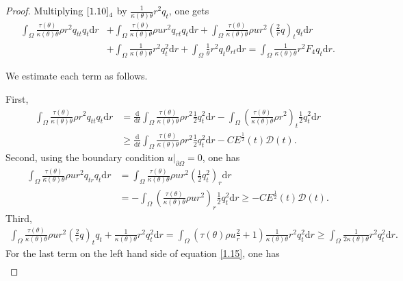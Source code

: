 \documentclass[11pt,reqno]{amsart}
\numberwithin{equation}{section}
\newcommand{\dif}{\mathrm{d}}
\begin{document}
\begin{proof}
 Multiplying $\eqref{1.10}_4$ by $\frac{1}{\kappa(\theta) \theta} r^2 q_t$, one gets
 \begin{align}
 \int_{\Omega}  \frac{\tau(\theta) }{\kappa(\theta) \theta} \rho r^2 q_{tt}  q_t\dif r&+\int_{\Omega} \frac{\tau(\theta) }{\kappa(\theta) \theta} \rho u r^2 q_{rt} q_t \dif r +\int_{\Omega} \frac{\tau(\theta) }{\kappa(\theta) \theta} \rho u r^2 \left(\frac{2}{r}q \right)_t q_t\dif r \nonumber\\
 &+\int_{\Omega} \frac{1}{\kappa(\theta)\theta} r^2 q_t^2 \dif r+\int_{\Omega} \frac{1}{\theta} r^2 q_t \theta_{rt} \dif r
 =\int_{\Omega} \frac{1}{\kappa(\theta)\theta} r^2 F_4 q_t \dif r. \label{1.15}
 \end{align}

 We estimate each term as follows.

 First,
 \begin{align*}
 \int_{\Omega} \frac{\tau(\theta) }{\kappa(\theta) \theta} \rho r^2 q_{tt} q_t\dif r&=\frac{\dif}{\dif t} \int_{\Omega} \frac{\tau(\theta) }{\kappa(\theta) \theta}\rho r^2 \frac{1}{2} q_t^2\dif r -\int_{\Omega} \left(\frac{\tau(\theta) }{\kappa(\theta) \theta} \rho r^2 \right)_t \frac{1}{2} q_t^2 \dif r\\
 & \ge \frac{\dif}{\dif t} \int_{\Omega} \frac{\tau(\theta) }{\kappa(\theta) \theta}\rho r^2 \frac{1}{2} q_t^2\dif r-CE^\frac{1}{2}(t) \mathcal D(t).
 \end{align*}
 Second, using the boundary condition $u|_{\partial \Omega}=0$, one has
 \begin{align*}
 \int_{\Omega} \frac{\tau(\theta) }{\kappa(\theta) \theta}  \rho u r^2 q_{tr} q_t \dif r &= \int_{\Omega} \frac{\tau(\theta) }{\kappa(\theta) \theta}  \rho u r^2 \left(\frac{1}{2} q_t^2\right)_r \dif r\\
 &=-\int_{\Omega} \left(\frac{\tau(\theta) }{\kappa(\theta) \theta}  \rho u r^2 \right)_r \frac{1}{2} q_t^2 \dif r \ge -CE^\frac{1}{2}(t) \mathcal D(t).
 \end{align*}
 Third,
 {\small
 \begin{align*}
 \int_{\Omega} \frac{\tau(\theta) }{\kappa(\theta) \theta}  \rho u r^2 \left(\frac{2}{r} q\right)_t q_t +\frac{1}{\kappa(\theta)\theta} r^2 q_t^2 \dif r
 =\int_{\Omega} \left( \tau(\theta) \rho u \frac{2}{r}+1\right) \frac{1}{\kappa(\theta)\theta} r^2 q_t^2 \dif r \ge \int_{\Omega} \frac{1}{2\kappa(\theta)\theta} r^2 q_t^2\dif r.
 \end{align*}}
 For the last term on the left hand side of equation \eqref{1.15}, one has
 \begin{align*}

\end{align*}
\end{proof}
\end{document}
